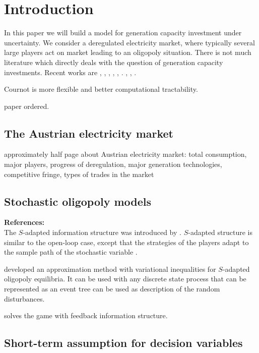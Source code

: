 \section{Introduction}

In this paper we will build a model for generation capacity investment under uncertainty. We consider a deregulated electricity market, where typically several large players act on market leading to an oligopoly situation. There is not much literature which directly deals with the question of  generation capacity investments. Recent works are \cite{Chuang2001}, \cite{Ventosa2002}, \cite{Chaton2003}, \cite{Hogendorn2003}, \cite{Pineau2003}, \cite{Ehrenmann2004}. \cite{Murphy2005}, \cite{Kiesling2007}, \cite{Pineau2007}.


Cournot is more flexible and better computational tractability.

\cite{Haurie2001} paper ordered.


\subsection{The Austrian electricity market}

approximately half page about Austrian electricity market: total consumption, major players, progress of deregulation, major generation technologies, competitive fringe, types of trades in the market


\subsection{Stochastic oligopoly models}

\textbf{References:} \cite{Salant1982, Wolf1997, Haurie2002, Pineau2003, Murto2004}\\


The $S$-adapted information structure was introduced by \cite{Haurie1990}.
$S$-adapted structure is similar to the open-loop case, except that the strategies of the players adapt to the sample path of the stochastic variable \citep[see][pg. 128]{Pineau2003}.

\cite{Haurie2002} developed an approximation method with variational inequalities for $S$-adapted oligopoly equilibria. It can be used with any discrete state process that can be represented as an event tree can be used as description of the random disturbances.

\cite{Murto2004} solves the game with feedback information structure.

\subsection{Short-term assumption for decision variables}


